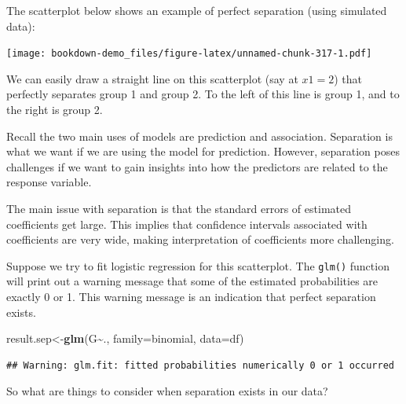 \documentclass[
]{book}
\newenvironment{Shaded}{\begin{snugshade}}{\end{snugshade}}
\newcommand{\AttributeTok}[1]{\textcolor[rgb]{0.13,0.29,0.53}{#1}}
\newcommand{\FunctionTok}[1]{\textcolor[rgb]{0.13,0.29,0.53}{\textbf{#1}}}
\newcommand{\NormalTok}[1]{#1}
\newcommand{\OtherTok}[1]{\textcolor[rgb]{0.56,0.35,0.01}{#1}}
\newcommand{\SpecialCharTok}[1]{\textcolor[rgb]{0.81,0.36,0.00}{\textbf{#1}}}
\begin{document}
The scatterplot below shows an example of perfect separation (using simulated data):

\texttt{[image: bookdown-demo\_files/figure-latex/unnamed-chunk-317-1.pdf]}

We can easily draw a straight line on this scatterplot (say at \(x1 = 2\)) that perfectly separates group 1 and group 2. To the left of this line is group 1, and to the right is group 2.

Recall the two main uses of models are prediction and association. Separation is what we want if we are using the model for prediction. However, separation poses challenges if we want to gain insights into how the predictors are related to the response variable.

The main issue with separation is that the standard errors of estimated coefficients get large. This implies that confidence intervals associated with coefficients are very wide, making interpretation of coefficients more challenging.

Suppose we try to fit logistic regression for this scatterplot. The \texttt{glm()} function will print out a warning message that some of the estimated probabilities are exactly 0 or 1. This warning message is an indication that perfect separation exists.

\begin{Shaded}
\begin{Highlighting}[]
\NormalTok{result.sep}\OtherTok{\textless{}{-}}\FunctionTok{glm}\NormalTok{(G}\SpecialCharTok{\textasciitilde{}}\NormalTok{., }\AttributeTok{family=}\NormalTok{binomial, }\AttributeTok{data=}\NormalTok{df)}
\end{Highlighting}
\end{Shaded}

\begin{verbatim}
## Warning: glm.fit: fitted probabilities numerically 0 or 1 occurred
\end{verbatim}

So what are things to consider when separation exists in our data?
\end{document}
